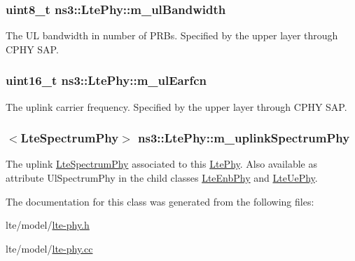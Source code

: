 \subsubsection[{\texorpdfstring{m\+\_\+ul\+Bandwidth}{m_ulBandwidth}}]{\setlength{\rightskip}{0pt plus 5cm}uint8\+\_\+t ns3\+::\+Lte\+Phy\+::m\+\_\+ul\+Bandwidth\hspace{0.3cm}{\ttfamily [protected]}}\hypertarget{classns3_1_1LtePhy_ac3eb3231fa82f4f60047b4752507a144}{}\label{classns3_1_1LtePhy_ac3eb3231fa82f4f60047b4752507a144}
The UL bandwidth in number of P\+R\+Bs. Specified by the upper layer through C\+P\+HY S\+AP. 
\subsubsection[{\texorpdfstring{m\+\_\+ul\+Earfcn}{m_ulEarfcn}}]{\setlength{\rightskip}{0pt plus 5cm}uint16\+\_\+t ns3\+::\+Lte\+Phy\+::m\+\_\+ul\+Earfcn\hspace{0.3cm}{\ttfamily [protected]}}\hypertarget{classns3_1_1LtePhy_a6dd4dee212ddb4d07b1f576524e0cc75}{}\label{classns3_1_1LtePhy_a6dd4dee212ddb4d07b1f576524e0cc75}
The uplink carrier frequency. Specified by the upper layer through C\+P\+HY S\+AP. 
\subsubsection[{\texorpdfstring{m\+\_\+uplink\+Spectrum\+Phy}{m_uplinkSpectrumPhy}}]{$<${\bf Lte\+Spectrum\+Phy}$>$ ns3\+::\+Lte\+Phy\+::m\+\_\+uplink\+Spectrum\+Phy\hspace{0.3cm}{\ttfamily [protected]}}\hypertarget{classns3_1_1LtePhy_addc3110b5a1f7b63c52f4ce8ca59c6cd}{}\label{classns3_1_1LtePhy_addc3110b5a1f7b63c52f4ce8ca59c6cd}
The uplink \hyperlink{classns3_1_1LteSpectrumPhy}{Lte\+Spectrum\+Phy} associated to this \hyperlink{classns3_1_1LtePhy}{Lte\+Phy}. Also available as attribute {\ttfamily Ul\+Spectrum\+Phy} in the child classes \hyperlink{classns3_1_1LteEnbPhy}{Lte\+Enb\+Phy} and \hyperlink{classns3_1_1LteUePhy}{Lte\+Ue\+Phy}. 

The documentation for this class was generated from the following files\+:\begin{DoxyCompactItemize}
\item 
lte/model/\hyperlink{lte-phy_8h}{lte-\/phy.\+h}\item 
lte/model/\hyperlink{lte-phy_8cc}{lte-\/phy.\+cc}\end{DoxyCompactItemize}
